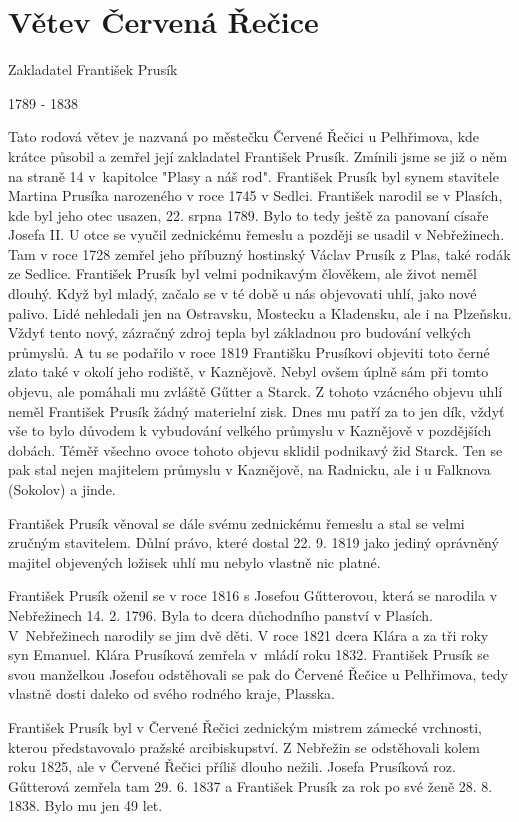 \documentclass[../dejiny-rodu-prusiku.tex]{subfiles}
\begin{document}
\chapter{Větev Červená Řečice}

Zakladatel František Prusík

1789 - 1838

Tato rodová větev je nazvaná po městečku Červené Řečici u Pelhřimova, kde krátce působil a zemřel její zakla­datel František Prusík. Zmínili jsme se již o něm na straně 14 v kapitolce "Plasy a náš rod".
František Prusík byl synem stavitele Martina Prusíka narozeného v roce 1745 v Sedlci. František narodil se v Plasích, kde byl jeho otec usazen, 22. srpna 1789. Bylo to tedy ještě za panovaní císaře Josefa II. U otce se vyučil zednickému řemeslu a později se usadil v Nebřežinech. Tam v roce 1728 zemřel jeho příbuzný hostinský Václav Prusík z Plas, také rodák ze Sedlice. František Prusík byl velmi podnikavým člověkem, ale život neměl dlouhý. Když byl mladý, začalo se v té době u nás objevovati uhlí, jako nové palivo. Lidé nehledali jen na Ostravsku, Mostecku a Kladensku, ale i na Plzeňsku. Vždyť tento nový, zázračný zdroj tepla byl zá­kladnou pro budování velkých průmyslů. A tu se podaři­lo v roce 1819 Františku Prusíkovi objeviti toto černé zlato také v okolí jeho rodiště, v Kaznějově. Nebyl ovšem úplně sám při tomto objevu, ale pomáhali mu zvláště Gűtter a Starck. Z tohoto vzácného objevu uhlí neměl František Prusík žádný materielní zisk. Dnes mu patří za to jen dík, vždyť vše to bylo důvodem k vybudování velkého průmyslu v Kaznějově v pozdějších dobách. Téměř všechno ovoce tohoto objevu sklidil podnikavý žid Starck. Ten se pak stal nejen majitelem průmyslu v Kaznějově, na Radnicku, ale i u Falknova (Sokolov) a jinde.

František Prusík věnoval se dále svému zednickému řemeslu a stal se velmi zručným stavitelem. Důlní právo, které dostal 22. 9. 1819 jako jediný oprávněný majitel objevených ložisek uhlí mu nebylo vlastně nic platné.

František Prusík oženil se v roce 1816 s Josefou Gűtterovou, která se narodila v Nebřežinech 14. 2. 1796. Byla to dcera důchodního panství v Plasích. V Nebřežinech narodily se jim dvě děti. V roce 1821 dcera Klára a za tři roky syn Emanuel. Klára Prusíková zemřela v mládí roku 1832. František Prusík se svou manželkou Josefou odstěhovali se pak do Červené Řečice u Pelhřimova, tedy vlastně dosti daleko od svého rodného kraje, Plasska.

František Prusík byl v Červené Řečici zednickým mistrem zámecké vrchnosti, kterou představovalo pražské arci­biskupství. Z Nebřežin se odstěhovali kolem roku 1825, ale v Červené Řečici příliš dlouho nežili. Josefa Prusíková roz. Gűtterová zemřela tam 29. 6. 1837 a František Prusík za rok po své ženě 28. 8. 1838. Bylo mu jen 49 let.
\end{document}
